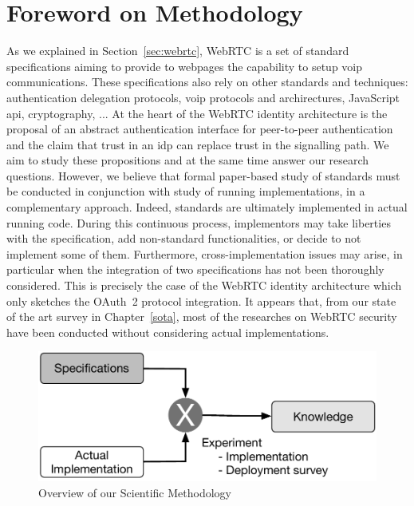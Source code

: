 \chapter*{Foreword on Methodology}
\thispagestyle{empty}

As we explained in Section~\ref{sec:webrtc}, WebRTC is a set of standard specifications aiming to provide to webpages the capability to setup \gls{voip} communications.
These specifications also rely on other standards and techniques: authentication delegation protocols, \gls{voip} protocols and archirectures, JavaScript \gls{api}, cryptography, ...
At the heart of the WebRTC identity architecture is the proposal of an abstract authentication interface for peer-to-peer authentication and the claim that trust in an \gls{idp} can replace trust in the signalling path. 
We aim to study these propositions and at the same time answer our research questions.
However, we believe that formal paper-based study of standards must be conducted in conjunction with study of running implementations, in a complementary approach.
Indeed, standards are ultimately implemented in actual running code.
During this continuous process, implementors may take liberties with the specification, add non-standard functionalities, or decide to not implement some of them.
Furthermore, cross-implementation issues may arise, in particular when the integration of two specifications has not been thoroughly considered.
This is precisely the case of the WebRTC identity architecture which only sketches the OAuth~2 protocol integration.
It appears that, from our state of the art survey in Chapter~\ref{sota}, most of the researches on WebRTC security have been conducted without considering actual implementations.

\begin{figure}[H]
\includegraphics[scale=.5]{images/science}
\caption{Overview of our Scientific Methodology}
\label{science}
\end{figure}

